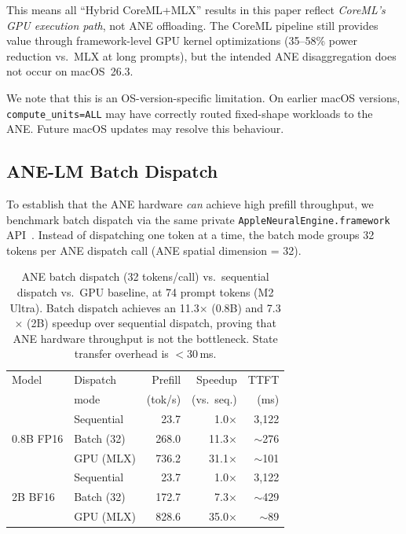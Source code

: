 \documentclass[11pt]{article}
\begin{document}
This means all ``Hybrid CoreML+MLX'' results in this paper reflect
\emph{CoreML's GPU execution path}, not ANE offloading.
The CoreML pipeline still provides value through framework-level GPU
kernel optimizations (35--58\% power reduction vs.\ MLX at long prompts),
but the intended ANE disaggregation does not occur on macOS~26.3.

We note that this is an OS-version-specific limitation.
On earlier macOS versions, \texttt{compute\_units=ALL} may have
correctly routed fixed-shape workloads to the ANE.
Future macOS updates may resolve this behaviour.

\subsection{ANE-LM Batch Dispatch}
\label{sec:ane_batch}

To establish that the ANE hardware \emph{can} achieve high prefill
throughput, we benchmark batch dispatch via the same private
\texttt{AppleNeuralEngine.framework} API~\cite{anelmbatch}.
Instead of dispatching one token at a time, the batch mode groups 32
tokens per ANE dispatch call (ANE spatial dimension = 32).

\begin{table}[h]
\centering
\small
\begin{tabular}{@{}llrrr@{}}
\toprule
Model & Dispatch & Prefill & Speedup & TTFT \\
 & mode & (tok/s) & (vs.\ seq.) & (ms) \\
\midrule
\multirow{3}{*}{0.8B FP16}
  & Sequential & 23.7  & 1.0$\times$ & 3{,}122 \\
  & Batch (32) & 268.0 & 11.3$\times$ & $\sim$276 \\
  & GPU (MLX)  & 736.2 & 31.1$\times$ & $\sim$101 \\
\midrule
\multirow{3}{*}{2B BF16}
  & Sequential &  23.7  & 1.0$\times$ & 3{,}122 \\
  & Batch (32) & 172.7 & 7.3$\times$ & $\sim$429 \\
  & GPU (MLX)  & 828.6 & 35.0$\times$ & $\sim$89 \\
\bottomrule
\end{tabular}
\caption{ANE batch dispatch (32 tokens/call) vs.\ sequential dispatch
  vs.\ GPU baseline, at 74 prompt tokens (M2 Ultra).
  Batch dispatch achieves an 11.3$\times$ (0.8B) and 7.3$\times$ (2B)
  speedup over sequential dispatch, proving that ANE hardware throughput
  is not the bottleneck.
  State transfer overhead is $<$30\,ms.}
\label{tab:ane_batch}
\end{table}
\end{document}
